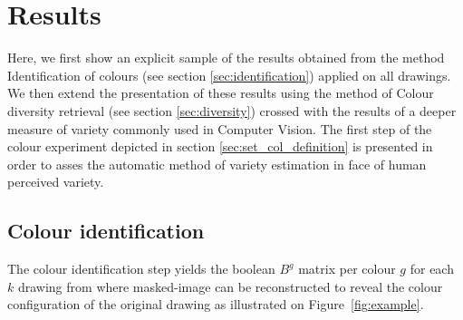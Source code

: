 \documentclass[11pt,a4paper]{article}
\begin{document}
\section{Results}
\label{sec:results}
Here, we first show an explicit sample of the results obtained from the method Identification of colours (see section \ref{sec:identification}) applied on all drawings. 
We then extend the presentation of these results using the method of Colour diversity retrieval (see section \ref{sec:diversity}) crossed with the results of a deeper measure of variety commonly used in Computer Vision. 
The first step of the colour experiment depicted in section \ref{sec:set_col_definition} is presented in order to asses the automatic method of variety estimation in face of human perceived variety.

\subsection{Colour identification}
\label{sec:results_identification}
The colour identification step yields the boolean $B^g$ matrix per colour $g$ for each $k$ drawing from where masked-image can be reconstructed to reveal the colour configuration of the original drawing as illustrated on Figure~\ref{fig:example}.
\end{document}

